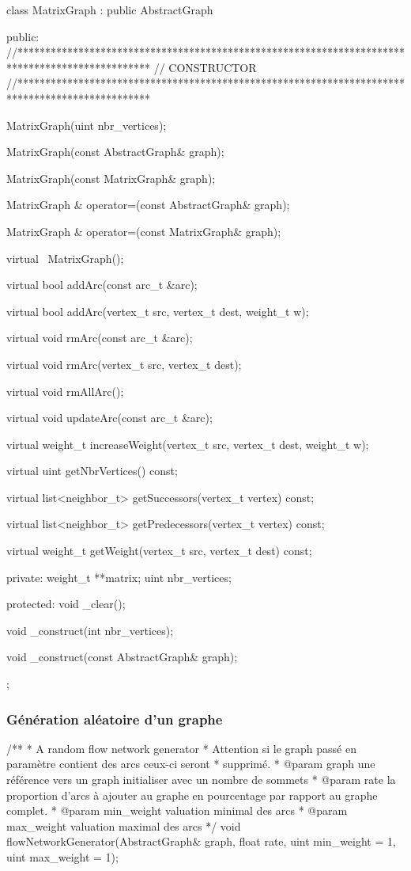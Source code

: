 class MatrixGraph : public AbstractGraph
{

public:
  //************************************************************************************************
  //      CONSTRUCTOR
  //************************************************************************************************

  MatrixGraph(uint nbr_vertices);

  MatrixGraph(const AbstractGraph& graph);

  MatrixGraph(const MatrixGraph& graph);

  MatrixGraph &
  operator=(const AbstractGraph& graph);

  MatrixGraph &
  operator=(const MatrixGraph& graph);

  virtual
  ~MatrixGraph();

  virtual bool
  addArc(const arc_t &arc);

  virtual bool
  addArc(vertex_t src, vertex_t dest, weight_t w);

  virtual void
  rmArc(const arc_t &arc);

  virtual void
  rmArc(vertex_t src, vertex_t dest);

  virtual void
  rmAllArc();

  virtual void
  updateArc(const arc_t &arc);

  virtual weight_t
  increaseWeight(vertex_t src, vertex_t dest, weight_t w);

  virtual uint
  getNbrVertices() const;

  virtual list<neighbor_t>
  getSuccessors(vertex_t vertex) const;

  virtual list<neighbor_t>
  getPredecessors(vertex_t vertex) const;

  virtual weight_t
  getWeight(vertex_t src, vertex_t dest) const;

private:
  weight_t **matrix;
  uint nbr_vertices;

protected:
  void
  _clear();

  void
  _construct(int nbr_vertices);

  void
  _construct(const AbstractGraph& graph);

};

\subsubsection{Génération aléatoire d'un graphe}


/**
 * A random flow network generator
 * Attention si le graph passé en paramètre contient des arcs ceux-ci seront
 * supprimé.
 * @param graph une référence vers un graph initialiser avec un nombre de sommets
 * @param rate la proportion d'arcs à ajouter au graphe en pourcentage par rapport au graphe complet.
 * @param min_weight valuation minimal des arcs
 * @param max_weight valuation maximal des arcs
 */
void
flowNetworkGenerator(AbstractGraph& graph, float rate, uint min_weight = 1,
    uint max_weight = 1);

